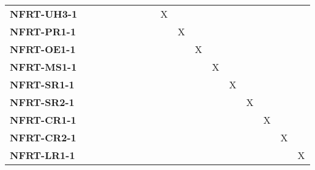 \documentclass[12pt, titlepage]{article}
\begin{document}
\begin{landscape}
\begin{longtable}{|l|cccccccccccccc|}
		\textbf{NFRT-UH3-1} & ~                                                         & ~            & ~            & ~            & ~            & X            & ~            & ~            & ~            & ~            & ~            & ~            & ~            & ~            \\
		\textbf{NFRT-PR1-1} & ~                                                         & ~            & ~            & ~            & ~            & ~            & X            & ~            & ~            & ~            & ~            & ~            & ~            & ~            \\
		\textbf{NFRT-OE1-1} & ~                                                         & ~            & ~            & ~            & ~            & ~            & ~            & X            & ~            & ~            & ~            & ~            & ~            & ~            \\
		\textbf{NFRT-MS1-1} & ~                                                         & ~            & ~            & ~            & ~            & ~            & ~            & ~            & X            & ~            & ~            & ~            & ~            & ~            \\
		\textbf{NFRT-SR1-1} & ~                                                         & ~            & ~            & ~            & ~            & ~            & ~            & ~            & ~            & X            & ~            & ~            & ~            & ~            \\
		\textbf{NFRT-SR2-1} & ~                                                         & ~            & ~            & ~            & ~            & ~            & ~            & ~            & ~            & ~            & X            & ~            & ~            & ~            \\
		\textbf{NFRT-CR1-1} & ~                                                         & ~            & ~            & ~            & ~            & ~            & ~            & ~            & ~            & ~            & ~            & X            & ~            & ~            \\
		\textbf{NFRT-CR2-1} & ~                                                         & ~            & ~            & ~            & ~            & ~            & ~            & ~            & ~            & ~            & ~            & ~            & X            & ~            \\
		\textbf{NFRT-LR1-1} & ~                                                         & ~            & ~            & ~            & ~            & ~            & ~            & ~            & ~            & ~            & ~            & ~            & ~            & X            \\
		\hline
	\end{longtable}
\end{landscape}
\end{document}

